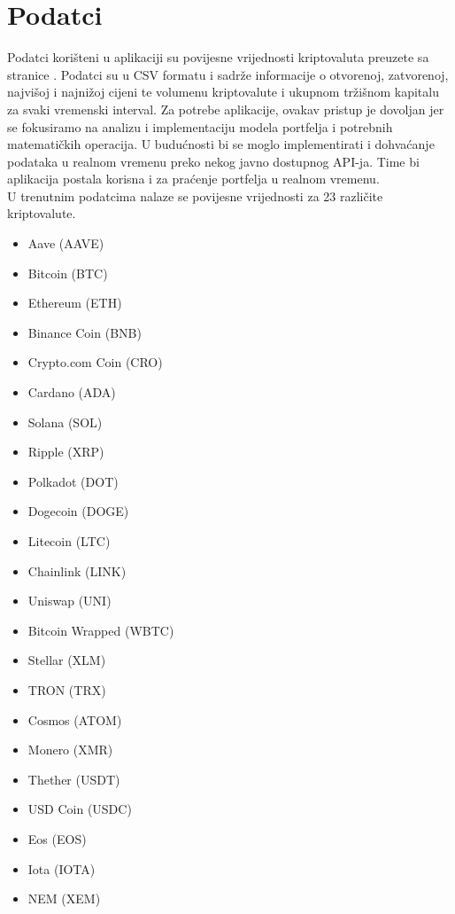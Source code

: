 \documentclass[zavrsnirad, upload]{fer}
\begin{document}
\section{Podatci}
\label{sek:podaci}
Podatci korišteni u aplikaciji su povijesne vrijednosti
kriptovaluta preuzete sa stranice \cite{kaggledataset}.
Podatci su u CSV formatu i sadrže informacije o otvorenoj, zatvorenoj,
najvišoj i najnižoj cijeni te volumenu kriptovalute i ukupnom tržišnom
kapitalu za svaki vremenski interval. Za potrebe aplikacije,
ovakav pristup je dovoljan jer se fokusiramo na analizu i
implementaciju modela portfelja i potrebnih matematičkih operacija.
U budućnosti bi se moglo implementirati i dohvaćanje podataka
u realnom vremenu preko nekog javno dostupnog API-ja. Time bi
aplikacija postala korisna i za praćenje portfelja u realnom vremenu.\\
U trenutnim podatcima nalaze se povijesne vrijednosti za 23 različite kriptovalute.
\begin{itemize}
    \item Aave (AAVE)
    \item Bitcoin (BTC)
    \item Ethereum (ETH)
    \item Binance Coin (BNB)
    \item Crypto.com Coin (CRO)
    \item Cardano (ADA)
    \item Solana (SOL)
    \item Ripple (XRP)
    \item Polkadot (DOT)
    \item Dogecoin (DOGE)
    \item Litecoin (LTC)
    \item Chainlink (LINK)
    \item Uniswap (UNI)
    \item Bitcoin Wrapped (WBTC)
    \item Stellar (XLM)
    \item TRON (TRX)
    \item Cosmos (ATOM)
    \item Monero (XMR)
    \item Thether (USDT)
    \item USD Coin (USDC)
    \item Eos (EOS)
    \item Iota (IOTA)
    \item NEM (XEM)
\end{itemize}


\end{document}
